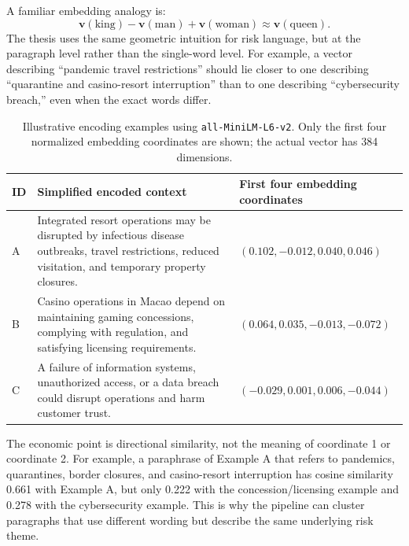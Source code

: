 \documentclass[11pt, a4paper]{article}
\begin{document}
A familiar embedding analogy is:
\begin{equation}
\mathbf{v}(\text{king})-\mathbf{v}(\text{man})+\mathbf{v}(\text{woman})\approx \mathbf{v}(\text{queen}).
\end{equation}
The thesis uses the same geometric intuition for risk language, but at the paragraph level rather than the single-word level. For example, a vector describing ``pandemic travel restrictions'' should lie closer to one describing ``quarantine and casino-resort interruption'' than to one describing ``cybersecurity breach,'' even when the exact words differ.

\begin{table}[H]
\centering
\caption[Illustrative encoding examples]{Illustrative encoding examples using \texttt{all-MiniLM-L6-v2}. Only the first four normalized embedding coordinates are shown; the actual vector has 384 dimensions.}
\label{tab:embedding_examples}
\scriptsize
\begin{tabularx}{\textwidth}{L{0.8cm}Y L{4.0cm}}
\toprule
ID & Simplified encoded context & First four embedding coordinates \\
\midrule
A & Integrated resort operations may be disrupted by infectious disease outbreaks, travel restrictions, reduced visitation, and temporary property closures. & $(0.102,-0.012,0.040,0.046)$ \\
B & Casino operations in Macao depend on maintaining gaming concessions, complying with regulation, and satisfying licensing requirements. & $(0.064,0.035,-0.013,-0.072)$ \\
C & A failure of information systems, unauthorized access, or a data breach could disrupt operations and harm customer trust. & $(-0.029,0.001,0.006,-0.044)$ \\
\bottomrule
\end{tabularx}
\end{table}

The economic point is directional similarity, not the meaning of coordinate 1 or coordinate 2. For example, a paraphrase of Example A that refers to pandemics, quarantines, border closures, and casino-resort interruption has cosine similarity 0.661 with Example A, but only 0.222 with the concession/licensing example and 0.278 with the cybersecurity example. This is why the pipeline can cluster paragraphs that use different wording but describe the same underlying risk theme.
\end{document}
